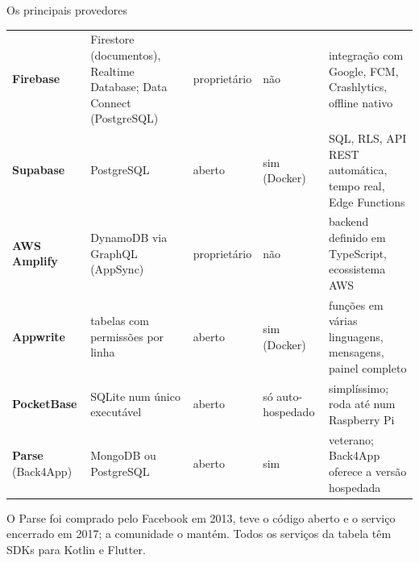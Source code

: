 \documentclass[aspectratio=169,10pt]{beamer}
\begin{document}
\begin{frame}{Os principais provedores}
  \scriptsize
  \begin{tabularx}{\textwidth}{@{}l L l l L@{}}
    \toprule
     &  &  &  &  \\
    \midrule
    \textbf{Firebase} & Firestore (documentos), Realtime Database; Data Connect (PostgreSQL) & proprietário & não & integração com Google, FCM, Crashlytics, offline nativo \\
    \textbf{Supabase} & PostgreSQL & aberto & sim (Docker) & SQL, RLS, API REST automática, tempo real, Edge Functions \\
    \textbf{AWS Amplify} & DynamoDB via GraphQL (AppSync) & proprietário & não & backend definido em TypeScript, ecossistema AWS \\
    \textbf{Appwrite} & tabelas com permissões por linha & aberto & sim (Docker) & funções em várias linguagens, mensagens, painel completo \\
    \textbf{PocketBase} & SQLite num único executável & aberto & só auto-hospedado & simplíssimo; roda até num Raspberry Pi \\
    \textbf{Parse} (Back4App) & MongoDB ou PostgreSQL & aberto & sim & veterano; Back4App oferece a versão hospedada \\
    \bottomrule
  \end{tabularx}
  \vspace{4pt}
  \begin{historia}
    O Parse foi comprado pelo Facebook em 2013, teve o código aberto e o serviço encerrado em 2017; a comunidade o mantém. Todos os serviços da tabela têm SDKs para Kotlin e Flutter.
  \end{historia}
\end{frame}
\end{document}
